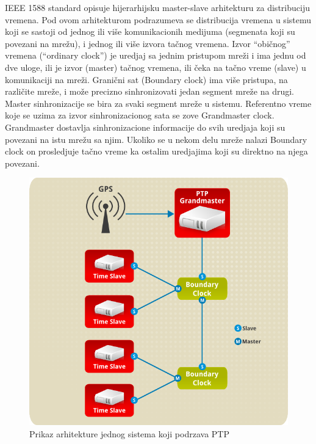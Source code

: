 \documentclass[a4paper,12pt, master]{etf}
\begin{document}
	IEEE 1588 standard opisuje hijerarhijsku master-slave arhitekturu za
	distribuciju vremena. Pod ovom arhitekturom podrazumeva se distribucija
	vremena u sistemu koji se sastoji od jednog ili vi\v{s}e komunikacionih
	medijuma (segmenata koji su povezani na mre\v{z}u), i jednog ili vi\v{s}e
	izvora ta\v{c}nog vremena. Izvor ``obi\v{c}nog'' vremena (``ordinary
    clock'') je uredjaj sa jednim pristupom mre\v{z}i i ima jednu od dve uloge,
    ili je izvor (master) ta\v{c}nog vremena, ili \v{c}eka na ta\v{c}no vreme
    (slave) u komunikaciji na mre\v{z}i. Grani\v{c}ni sat (Boundary clock) ima
    vi\v{s}e pristupa, na razli\v{c}ite mre\v{z}e, i mo\v{z}e precizno
    sinhronizovati jedan segment mre\v{z}e na drugi. Master sinhronizacije se
    bira za svaki segment mre\v{z}e u sistemu. Referentno vreme koje se uzima za
	izvor sinhronizacionog sata se zove Grandmaster clock. Grandmaster
	dostavlja sinhronizacione informacije do svih uredjaja koji su povezani na
	istu mre\v{z}u sa njim. Ukoliko se u nekom delu mre\v{z}e nalazi Boundary
	clock on prosledjuje ta\v{c}no vreme ka ostalim uredjajima koji su direktno
	na njega povezani.

	\begin{figure}[htb]
			\centering
			\includegraphics[scale=.3]{../pic/arch_ptp_system.png}
			\caption{Prikaz arhitekture jednog sistema koji podrzava PTP}
			\label{fig:arch_ptp_system}
	\end{figure}
\end{document}
